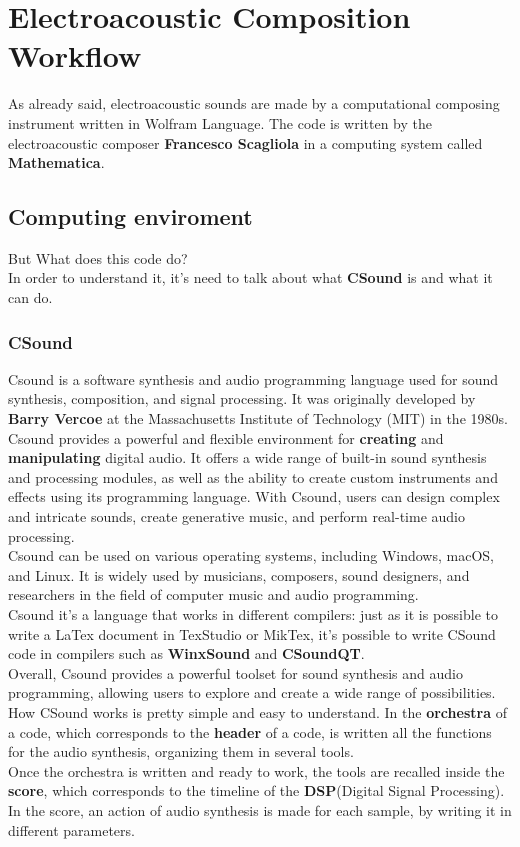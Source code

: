 
\chapter{Electroacoustic Composition Workflow}
\label{chp:fundamentals}

As already said, electroacoustic sounds are made by a computational composing instrument written in Wolfram Language. The code is written by the electroacoustic composer \textbf{Francesco Scagliola} in a computing system called \textbf{Mathematica}.
	
	\section{Computing enviroment}
	But What does this code do? \\
	In order to understand it, it's need to talk about what \textbf{CSound} is and what it can do.
	
		\subsection{CSound}
		Csound is a software synthesis and audio programming language used for sound synthesis, composition, and signal processing. It was originally developed by \textbf{Barry Vercoe} at the Massachusetts Institute of Technology (MIT) in the 1980s.
		Csound provides a powerful and flexible environment for \textbf{creating} and \textbf{manipulating} digital audio. It offers a wide range of built-in sound synthesis and processing modules, as well as the ability to create custom instruments and effects using its programming language. With Csound, users can design complex and intricate sounds, create generative music, and perform real-time audio processing. \\
		Csound can be used on various operating systems, including Windows, macOS, and Linux. It is widely used by musicians, composers, sound designers, and researchers in the field of computer music and audio programming. \\
		Csound it's a language that works in different compilers: just as it is possible to write a LaTex document in TexStudio or MikTex, it's possible to write CSound code in compilers such as \textbf{WinxSound} and \textbf{CSoundQT}. \\
		Overall, Csound provides a powerful toolset for sound synthesis and audio programming, allowing users to explore and create a wide range of possibilities.
		How CSound works is pretty simple and easy to understand. In the \textbf{orchestra} of a code, which corresponds to the \textbf{header} of a code, is written all the functions for the audio synthesis, organizing them in several tools. \\
		Once the orchestra is written and ready to work, the tools are recalled inside the \textbf{score}, which corresponds to the timeline of the \textbf{DSP}(Digital Signal Processing). \\
		In the score, an action of audio synthesis is made for each sample, by writing it in different parameters.
		
